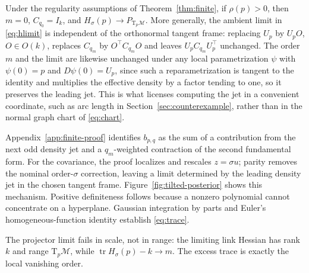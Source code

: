 \documentclass[10pt]{article}
\theoremstyle{c2fup}
\newcommand{\M}{\mathcal{M}}
\newcommand{\T}{\mathrm{T}}
\newcommand{\tr}{\operatorname{tr}}
\begin{document}
\begin{corollary}
\label{cor:regular}
Under the regularity assumptions of Theorem~\ref{thm:finite}, if $\rho(p)>0$, then $m=0$, $C_{q_0}=I_k$, and
$H_\sigma(p)\to P_{\T_p\M}$.  More generally, the ambient limit in
\eqref{eq:hlimit} is independent of the orthonormal tangent frame: replacing
$U_p$ by $U_pO$, $O\in O(k)$, replaces $C_{q_m}$ by
$O^\top C_{q_m}O$ and leaves $U_pC_{q_m}U_p^\top$ unchanged.  The order $m$ and
the limit are likewise unchanged under any local parametrization $\psi$ with
$\psi(0)=p$ and $D\psi(0)=U_p$, since such a reparametrization is tangent to the
identity and multiplies the effective density by a factor tending to one, so it
preserves the leading jet.  This is what licenses computing the jet in a
convenient coordinate, such as arc length in Section~\ref{sec:counterexample},
rather than in the normal graph chart of \eqref{eq:chart}.
\end{corollary}

Appendix~\ref{app:finite-proof} identifies $b_{p,q}$ as the sum of a contribution from the next odd density jet and a $q_m$-weighted contraction of the second fundamental form.  For the covariance, the proof localizes and rescales $z=\sigma u$; parity removes the nominal order-$\sigma$ correction, leaving a limit determined by the leading density jet in the chosen tangent frame.  Figure~\ref{fig:tilted-posterior} shows this mechanism.  Positive definiteness follows because a nonzero polynomial cannot concentrate on a hyperplane.  Gaussian integration by parts and Euler's homogeneous-function identity establish \eqref{eq:trace}.

\begin{takeawaybox}
The projector limit fails in scale, not in range: the limiting link Hessian has rank $k$ and range $\T_p\M$, while $\tr H_\sigma(p)-k\to m$.  The excess trace is exactly the local vanishing order.
\end{takeawaybox}
\end{document}
